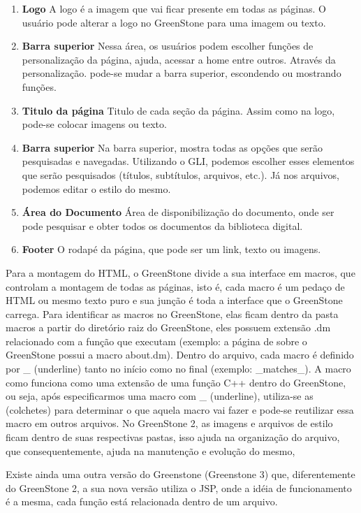 \begin{enumerate}
  \item \textbf{Logo} A logo é a imagem que vai ficar presente em todas as páginas. O usuário pode alterar a logo no GreenStone para uma imagem ou texto.
  \item \textbf{Barra superior} Nessa área, os usuários podem escolher funções de personalização da página, ajuda, acessar a home entre outros. Através da personalização. pode-se mudar a barra superior, escondendo ou mostrando funções.
  \item \textbf{Titulo da página} Titulo de cada seção da página. Assim como na logo, pode-se colocar imagens ou texto.
  \item \textbf{Barra superior} Na barra superior, mostra todas as opções que serão pesquisadas e navegadas. Utilizando o GLI, podemos escolher esses elementos que serão pesquisados (títulos, subtítulos, arquivos, etc.). Já nos arquivos, podemos editar o estilo do mesmo.
  \item \textbf{Área do Documento} Área de disponibilização do documento, onde ser pode pesquisar e obter todos os documentos da biblioteca digital.
  \item \textbf{Footer} O rodapé da página, que pode ser um link, texto ou imagens.
\end{enumerate}

Para a montagem do HTML, o GreenStone divide a sua interface em macros, que controlam a montagem de todas as páginas, isto é, cada macro é um pedaço de HTML ou mesmo texto puro e sua junção é toda a interface que o GreenStone carrega. Para identificar as macros no GreenStone, elas ficam dentro da pasta macros a partir do diretório raiz do GreenStone, eles possuem extensão .dm relacionado com a função que executam (exemplo: a página de sobre o GreenStone possui a macro about.dm). Dentro do arquivo, cada macro é definido por \_ (underline) tanto no início como no final (exemplo: \_matches\_).  A macro como funciona como uma extensão de uma função C++ dentro do GreenStone, ou seja, após especificarmos uma macro com \_ (underline), utiliza-se as {} (colchetes) para determinar o que aquela macro vai fazer e pode-se reutilizar essa macro em outros arquivos. No GreenStone 2, as imagens e arquivos de estilo ficam dentro de suas respectivas pastas, isso ajuda na organização do arquivo, que consequentemente, ajuda na manutenção e evolução do mesmo,

Existe ainda uma outra versão do Greenstone (Greenstone 3) que, diferentemente do GreenStone 2, a sua nova versão utiliza o JSP, onde a idéia de funcionamento é a mesma, cada função está relacionada dentro de um arquivo.
 
